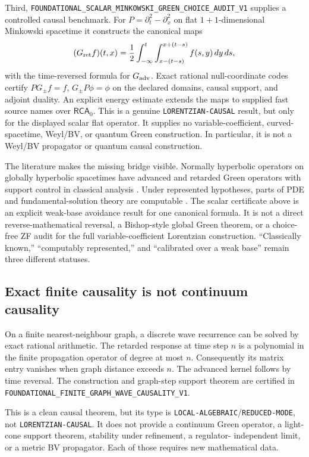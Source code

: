 \documentclass[11pt]{article}
\theoremstyle{definition}
\theoremstyle{remark}
\newcommand{\RCA}{\mathsf{RCA}_{0}}
\newcommand{\cert}[1]{\nolinkurl{#1}}
\newcommand{\rtype}[1]{\nolinkurl{#1}}
\begin{document}
Third, \cert{FOUNDATIONAL_SCALAR_MINKOWSKI_GREEN_CHOICE_AUDIT_V1} supplies a
controlled causal benchmark.  For
\(P=\partial_t^2-\partial_x^2\) on flat \(1+1\)-dimensional Minkowski
spacetime it constructs the canonical maps
\[
 (G_{\rm ret}f)(t,x)=\frac12\int_{-\infty}^{t}
   \int_{x-(t-s)}^{x+(t-s)}f(s,y)\,dy\,ds,
\]
with the time-reversed formula for $G_{\rm adv}$.  Exact rational null-coordinate
codes certify $PG_\pm f=f$, $G_\pm P\phi=\phi$ on the declared domains,
causal support, and adjoint duality.  An explicit energy estimate extends the
maps to supplied fast source names over \(\RCA\).  This is a genuine
\rtype{LORENTZIAN-CAUSAL} result, but only for the displayed scalar flat
operator.  It supplies no variable-coefficient, curved-spacetime, Weyl/BV, or
quantum Green construction.  In particular, it is not a Weyl/BV propagator or
quantum causal construction.

The literature makes the missing bridge visible.  Normally hyperbolic
operators on globally hyperbolic spacetimes have advanced and retarded Green
operators with support control in classical analysis \cite{Baer2015}.  Under
represented hypotheses, parts of PDE and fundamental-solution theory are
computable \cite{WeihrauchZhong2002,WeihrauchZhong2006}.  The scalar certificate
above is an explicit weak-base avoidance result for one canonical formula.  It
is not a direct reverse-mathematical reversal, a Bishop-style global Green
theorem, or a choice-free ZF audit for the full variable-coefficient
Lorentzian construction.  ``Classically known,'' ``computably represented,''
and ``calibrated over a weak base'' remain three different statuses.

\subsection{Exact finite causality is not continuum causality}

On a finite nearest-neighbour graph, a discrete wave recurrence can be solved
by exact rational arithmetic.  The retarded response at time step \(n\) is a
polynomial in the finite propagation operator of degree at most \(n\).
Consequently its matrix entry vanishes when graph distance exceeds \(n\).
The advanced kernel follows by time reversal.  The construction and graph-step
support theorem are certified in
\cert{FOUNDATIONAL_FINITE_GRAPH_WAVE_CAUSALITY_V1}.

This is a clean causal theorem, but its type is
\rtype{LOCAL-ALGEBRAIC}/\rtype{REDUCED-MODE}, not
\rtype{LORENTZIAN-CAUSAL}.  It does not provide a continuum Green operator,
a light-cone support theorem, stability under refinement, a regulator-
independent limit, or a metric BV propagator.  Each of those requires new
mathematical data.
\end{document}
